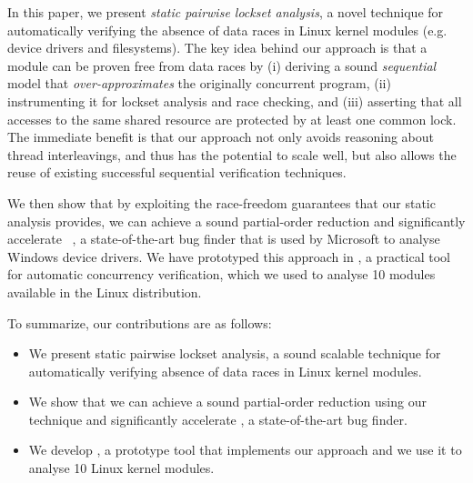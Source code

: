 In this paper, we present \emph{static pairwise lockset analysis}, a novel technique for automatically verifying the absence of data races in Linux kernel modules (e.g. device drivers and filesystems). The key idea behind our approach is that a module can be proven free from data races by (i) deriving a sound \emph{sequential} model that \emph{over-approximates} the originally concurrent program, (ii) instrumenting it for lockset analysis and race checking, and (iii) asserting that all accesses to the same shared resource are protected by at least one common lock. The immediate benefit is that our approach not only avoids reasoning about thread interleavings, and thus has the potential to scale well, but also allows the reuse of existing successful sequential verification techniques.

We then show that by exploiting the race-freedom guarantees that our static analysis provides, we can achieve a sound partial-order reduction and significantly accelerate \corral~\cite{lal2012solver}, a state-of-the-art bug finder that is used by Microsoft to analyse Windows device drivers. We have prototyped this approach in \whoop, a practical tool for automatic concurrency verification, which we used to analyse 10 modules available in the Linux distribution.

To summarize, our contributions are as follows:
\begin{itemize}
\item We present static pairwise lockset analysis,  a sound scalable technique for automatically verifying absence of data races in Linux kernel modules.
\item We show that we can achieve a sound partial-order reduction using our technique and significantly accelerate \corral, a state-of-the-art bug finder.
\item We develop \whoop, a prototype tool that implements our approach and we use it to analyse 10 Linux kernel modules.
\end{itemize}